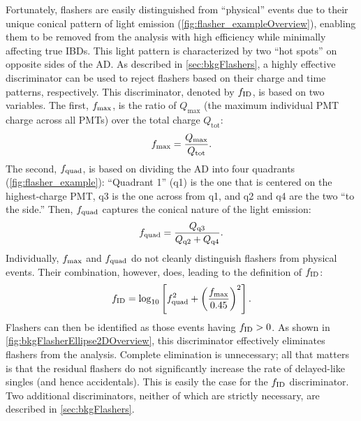\documentclass[../thesis.tex]{subfiles}
\begin{document}
Fortunately, flashers are easily distinguished from ``physical'' events due to their unique conical pattern of light emission (\autoref{fig:flasher_exampleOverview}), enabling them to be removed from the analysis with high efficiency while minimally affecting true IBDs. This light pattern is characterized by two ``hot spots'' on opposite sides of the AD. As described in \autoref{sec:bkgFlashers}, a highly effective discriminator can be used to reject flashers based on their charge and time patterns, respectively. This discriminator, denoted by $f_{\mathrm{ID}}$, is based on two variables. The first, $f_{\mathrm{max}}$, is the ratio of $Q_{\mathrm{max}}$ (the maximum individual PMT charge across all PMTs) over the total charge $Q_{\mathrm{tot}}$:
\begin{equation}
  f_{\mathrm{max}} = \frac{Q_{\mathrm{max}}}{Q_{\mathrm{tot}}}.
\end{equation}
The second, $f_{\mathrm{quad}}$, is based on dividing the AD into four quadrants (\autoref{fig:flasher_example}): ``Quadrant 1'' (q1) is the one that is centered on the highest-charge PMT, q3 is the one across from q1, and q2 and q4 are the two ``to the side.'' Then, $f_{\mathrm{quad}}$ captures the conical nature of the light emission:
\begin{equation}
  f_{\mathrm{quad}} = \frac{Q_{\mathrm{q3}}}{Q_{\mathrm{q2}} + Q_{\mathrm{q4}}}.
\end{equation}
Individually, $f_{\mathrm{max}}$ and $f_{\mathrm{quad}}$ do not cleanly distinguish flashers from physical events. Their combination, however, does, leading to the definition of $f_{\mathrm{ID}}$:
\begin{equation}
  f_{\mathrm{ID}} = \log_{10} \left[ f_{\mathrm{quad}}^2 + \left( \frac{f_{\mathrm{max}}}{0.45} \right)^2 \right].
\end{equation}
Flashers can then be identified as those events having $f_{\mathrm{ID}} > 0$. As shown in \autoref{fig:bkgFlasherEllipse2DOverview}, this discriminator effectively eliminates flashers from the analysis. Complete elimination is unnecessary; all that matters is that the residual flashers do not significantly increase the rate of delayed-like singles (and hence accidentals). This is easily the case for the $f_{\mathrm{ID}}$ discriminator. Two additional discriminators, neither of which are strictly necessary, are described in \autoref{sec:bkgFlashers}.

\end{document}

